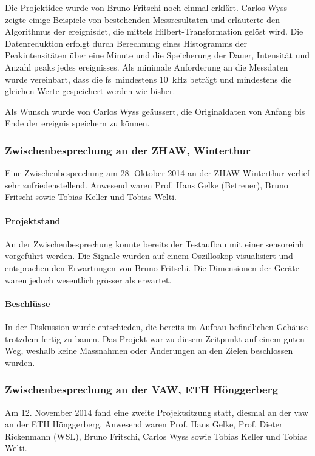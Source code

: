 Die Projektidee wurde von Bruno Fritschi noch einmal erklärt. Carlos Wyss zeigte einige Beispiele von bestehenden Messresultaten und erläuterte den Algorithmus der \gls{ereignisdet}, die mittels Hilbert-Transformation gelöst wird. Die Datenreduktion erfolgt durch Berechnung eines Histogramms der Peakintensitäten über eine Minute und die Speicherung der Dauer, Intensität und Anzahl \glspl{peak} jedes \gls{ereignis}ses. Als minimale Anforderung an die Messdaten wurde vereinbart, dass die \gls{fs} mindestens 10~kHz beträgt und mindestens die gleichen Werte gespeichert werden wie bisher.

Als Wunsch wurde von Carlos Wyss geäussert, die Originaldaten von Anfang bis Ende der \gls{ereignis} speichern zu können.


\subsubsection{Zwischenbesprechung an der ZHAW, Winterthur}
Eine Zwischenbesprechung am 28. Oktober 2014 an der ZHAW Winterthur verlief sehr zufriedenstellend. Anwesend waren Prof. Hans Gelke (Betreuer), Bruno Fritschi sowie Tobias Keller und Tobias Welti.

\paragraph{Projektstand} An der Zwischenbesprechung konnte bereits der Testaufbau mit einer \gls{sensoreinh} vorgeführt werden. Die Signale wurden auf einem Oszilloskop visualisiert und entsprachen den Erwartungen von Bruno Fritschi. Die Dimensionen der Geräte waren jedoch wesentlich grösser als erwartet. 

\paragraph{Beschlüsse} In der Diskussion wurde entschieden, die bereits im Aufbau befindlichen Gehäuse trotzdem fertig zu bauen. Das Projekt war zu diesem Zeitpunkt auf einem guten Weg, weshalb keine Massnahmen oder Änderungen an den Zielen beschlossen wurden.

\subsubsection{Zwischenbesprechung an der VAW, ETH Hönggerberg}
Am 12. November 2014 fand eine zweite Projektsitzung statt, diesmal an der \gls{vaw} an der ETH Hönggerberg. Anwesend waren Prof. Hans Gelke, Prof. Dieter Rickenmann (WSL), Bruno Fritschi, Carlos Wyss sowie Tobias Keller und Tobias Welti.

